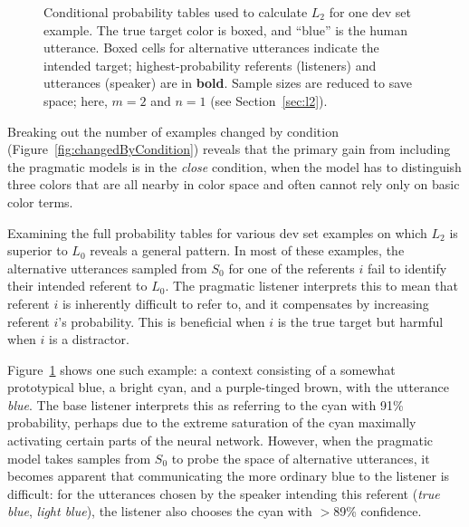 \documentclass[11pt,letterpaper]{article}
\newcommand{\Listener}{L}
\newcommand{\Speaker}{S}
\renewcommand{\|}{\mid}
\newcommand{\best}[1]{\textbf{#1}}
\newcommand{\secref}[1]{Section~\ref{#1}}
\newcommand{\Figref}[1]{Figure~\ref{#1}}
\newcommand{\figref}[1]{Figure~\ref{#1}}
\newcommand{\colorPatch}[2][xxxx]{
  \colorbox[HTML]{#2}{{\color[HTML]{#2}#1}}}
\newcommand{\colorContext}[4]{
  \framebox{\negthickspace\colorPatch{#1}} & \colorPatch{#2} & \colorPatch{#3} & #4}
\newcommand{\cond}{\emph}
\begin{document}
\begin{figure}[t!]
\begin{tabular}{lr@{\hskip 5pt}r@{\hskip 5pt}r@{}r}
\end{tabular}
\caption{Conditional probability tables used to calculate $\Listener_2$
for one dev set example. The true target color is boxed, and ``blue'' is
the human utterance. Boxed cells for alternative
utterances indicate the intended target; highest-probability referents
(listeners) and utterances (speaker) are in \textbf{bold}.
Sample sizes are reduced to save space; here,
$m = 2$ and $n = 1$ (see \secref{sec:l2}).}
\label{fig:rsaExample}
\end{figure}

Breaking out the number of examples changed by condition
(\figref{fig:changedByCondition}) reveals that
the primary gain from including the pragmatic models is in the
\cond{close} condition, when the
model has to distinguish three colors that are all nearby in color space and
often cannot rely only on basic color terms.

Examining the full probability tables for various dev set examples on which
$\Listener_2$ is superior to $\Listener_0$ reveals a general pattern. In most
of these examples, the alternative utterances sampled from $\Speaker_0$ for one
of the referents $i$ fail to identify
their intended referent to $\Listener_0$. The pragmatic listener interprets
this to mean that referent $i$ is inherently difficult to refer to,
and it compensates by increasing referent $i$'s probability. This is beneficial
when $i$ is the true target but harmful when $i$ is a distractor.

\Figref{fig:rsaExample}
shows one such example: a context consisting of a somewhat prototypical blue,
a bright cyan, and a purple-tinged brown, with the utterance \textit{blue}. The
base listener interprets this as referring to the cyan with 91\% probability,
perhaps due to the extreme saturation of the cyan maximally activating certain
parts of the neural network. However, when the pragmatic model takes samples
from $\Speaker_0$ to probe the space of alternative utterances, it becomes
apparent that communicating the more ordinary blue to the listener is difficult:
for the utterances chosen by the speaker intending this referent (\textit{true blue},
\textit{light blue}), the listener also
chooses the cyan with $>$89\% confidence.
\end{document}
